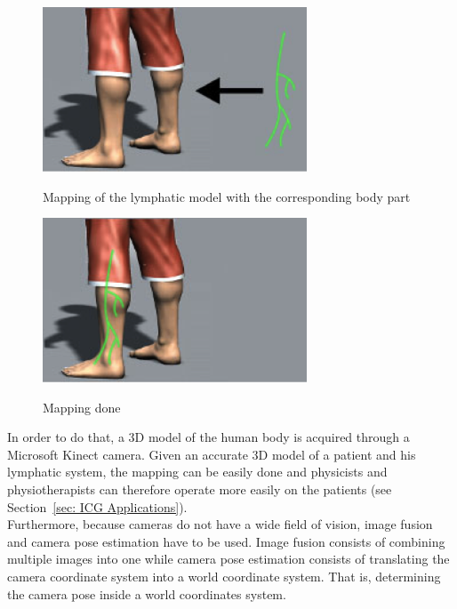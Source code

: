 \begin{figure}[h]
\caption{Mapping of the lymphatic model with the corresponding body part}
\centering
    \includegraphics[width=0.7\textwidth]{images/mapping1.png}
\label{fig:mapping1}
\end{figure}

\begin{figure}[h]
\caption{Mapping done}
\centering
    \includegraphics[width=0.7\textwidth]{images/mapping2.png}
\label{fig:mapping2}
\end{figure}

In order to do that, a 3D model of the human body is acquired through a Microsoft Kinect camera. Given an accurate 3D model of a patient and his lymphatic system, the mapping can be easily done and physicists and physiotherapists can therefore operate more easily on the patients (see Section~\ref{sec: ICG Applications}). \\

Furthermore, because cameras do not have a wide field of vision, image fusion and camera pose estimation have to be used. Image fusion consists of combining multiple images into one while camera pose estimation consists of translating the camera coordinate system into a world coordinate system. That is, determining the camera pose inside a world coordinates system. \\

